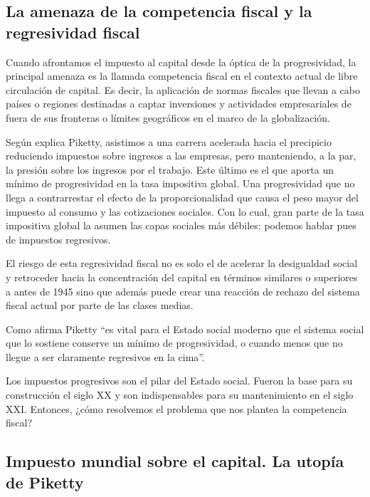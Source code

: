 \documentclass[
]{article}
\begin{document}
\hypertarget{la-amenaza-de-la-competencia-fiscal-y-la-regresividad-fiscal}{%
\subsection{La amenaza de la competencia fiscal y la regresividad
fiscal}\label{la-amenaza-de-la-competencia-fiscal-y-la-regresividad-fiscal}}

Cuando afrontamos el impuesto al capital desde la óptica de la
progresividad, la principal amenaza es la llamada competencia fiscal en
el contexto actual de libre circulación de capital. Es decir, la
aplicación de normas fiscales que llevan a cabo países o regiones
destinadas a captar inversiones y actividades empresariales de fuera de
sus fronteras o límites geográficos en el marco de la globalización.

Según explica Piketty, asistimos a una carrera acelerada hacia el
precipicio reduciendo impuestos sobre ingresos a las empresas, pero
manteniendo, a la par, la presión sobre los ingresos por el trabajo.
Este último es el que aporta un mínimo de progresividad en la tasa
impositiva global. Una progresividad que no llega a contrarrestar el
efecto de la proporcionalidad que causa el peso mayor del impuesto al
consumo y las cotizaciones sociales. Con lo cual, gran parte de la tasa
impositiva global la asumen las capas sociales más débiles: podemos
hablar pues de impuestos regresivos.

El riesgo de esta regresividad fiscal no es solo el de acelerar la
desigualdad social y retroceder hacia la concentración del capital en
términos similares o superiores a antes de 1945 sino que además puede
crear una reacción de rechazo del sistema fiscal actual por parte de las
clases medias.

Como afirma Piketty ``es vital para el Estado social moderno que el
sistema social que lo sostiene conserve un mínimo de progresividad, o
cuando menos que no llegue a ser claramente regresivos en la cima''.

Los impuestos progresivos son el pilar del Estado social. Fueron la base
para su construcción el siglo XX y son indispensables para su
mantenimiento en el siglo XXI. Entonces, ¿cómo resolvemos el problema
que nos plantea la competencia fiscal?

\hypertarget{impuesto-mundial-sobre-el-capital.-la-utopuxeda-de-piketty}{%
\subsection{Impuesto mundial sobre el capital. La utopía de
Piketty}\label{impuesto-mundial-sobre-el-capital.-la-utopuxeda-de-piketty}}
\end{document}
